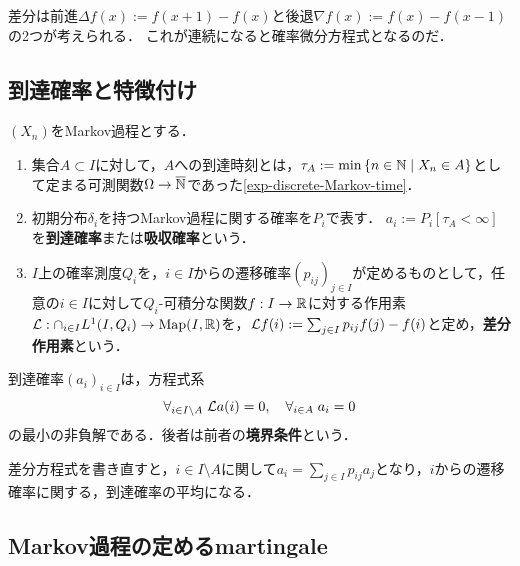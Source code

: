 \documentclass[uplatex,dvipdfmx]{jsreport}
\begin{document}
\begin{tcolorbox}[colframe=ForestGreen, colback=ForestGreen!10!white,breakable,colbacktitle=ForestGreen!40!white,coltitle=black,fonttitle=\bfseries\sffamily,
title=]
    差分は前進$\Delta f(x):=f(x+1)-f(x)$と後退$\nabla f(x):=f(x)-f(x-1)$の2つが考えられる．
    これが連続になると確率微分方程式となるのだ．
\end{tcolorbox}

\subsection{到達確率と特徴付け}

\begin{definition}
    $(X_n)$をMarkov過程とする．
    \begin{enumerate}
        \item 集合$A\subset I$に対して，$A$への到達時刻とは，$\tau_A:=\min\left\{n\in\mathbb{N}\mid X_n\in A\right\}$として定まる可測関数$\Omega\to\overline{\mathbb{N}}$であった\ref{exp-discrete-Markov-time}．
        \item 初期分布$\delta_i$を持つMarkov過程に関する確率を$P_i$で表す．
        $a_i:=P_i[\tau_A<\infty]$を\textbf{到達確率}または\textbf{吸収確率}という．
        \item $I$上の確率測度$Q_i$を，$i\in I$からの遷移確率$(p_{ij})_{j\in I}$が定めるものとして，任意の$i\in I$に対して$Q_i$-可積分な関数$f:I\to\mathbb{R}$に対する作用素
        $\mathcal{L}:\cap_{i\in I}L^1(I,Q_i)\to\mathrm{Map}(I,\mathbb{R})$を，$\mathcal{L} f(i):=\sum_{j\in I}p_{ij}f(j)-f(i)$と定め，\textbf{差分作用素}という．
    \end{enumerate}
\end{definition}

\begin{theorem}[到達確率の特徴付け]
    到達確率$(a_i)_{i\in I}$は，方程式系
    \[\forall_{i\in I\setminus A}\;\mathcal{L} a(i)=0,\quad\forall_{i\in A}\;a_i=0\]
    の最小の非負解である．後者は前者の\textbf{境界条件}という．
\end{theorem}
\begin{remarks}
    差分方程式を書き直すと，$i\in I\setminus A$に関して$a_i=\sum_{j\in I}p_{ij}a_j$となり，$i$からの遷移確率に関する，到達確率の平均になる．
\end{remarks}

\subsection{Markov過程の定めるmartingale}
\end{document}
